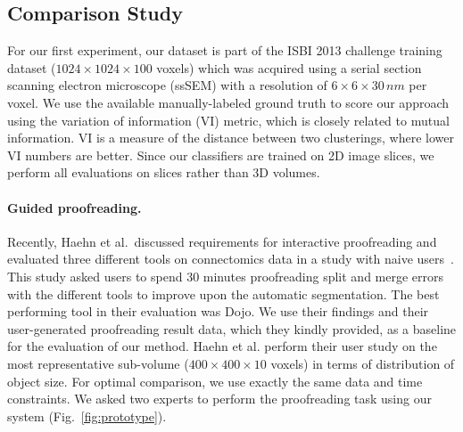\subsection{Comparison Study}
\label{sec:comparisonstudy}
For our first experiment, our dataset is part of the ISBI 2013 challenge training dataset ($1024\times1024\times100$ voxels) which was acquired using a serial section scanning electron microscope (ssSEM) with a resolution of $6\times6\times30\, nm$ per voxel. We use the available manually-labeled ground truth to score our approach using the variation of information (VI) metric, which is closely related to mutual information. VI is a measure of the distance between two clusterings, where lower VI numbers are better. Since our classifiers are trained on 2D image slices, we perform all evaluations on slices rather than 3D volumes.



\paragraph{Guided proofreading.}
Recently, Haehn et al.~discussed requirements for interactive proofreading and evaluated three different tools on connectomics data in a study with naive users~\cite{haehn_dojo_2014}. This study asked users to spend 30 minutes proofreading split and merge errors with the different tools to improve upon the automatic segmentation. The best performing tool in their evaluation was Dojo. We use their findings and their user-generated proofreading result data, which they kindly provided, as a baseline for the evaluation of our method.
Haehn et al. perform their user study on the most representative sub-volume ($400\times400\times10$ voxels) in terms of distribution of object size. For optimal comparison, we use exactly the same data and time constraints. We asked two experts to perform the proofreading task using our system (Fig.~\ref{fig:prototype}).


